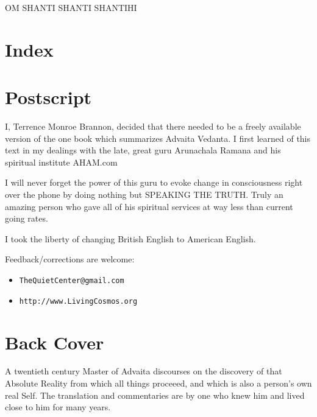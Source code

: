 \documentclass[12pt]{report}
\begin{document}
OM SHANTI SHANTI SHANTIHI



\chapter{Index}
\printindex

\chapter{Postscript}

I, Terrence Monroe Brannon, decided that there needed to be a freely
available version of the one book which summarizes Advaita Vedanta. I
first learned of this text in my dealings with the late, great
guru Arunachala
Ramana and his spiritual institute AHAM.com

I will never forget the power of this guru to evoke change in
consciousness
right over the phone by doing nothing but SPEAKING THE TRUTH. Truly an
amazing person who gave all of his spiritual services at way less than
current going rates.

I took the liberty of changing British English to American English.

Feedback/corrections are welcome: 
\begin{itemize}
\item \verb+TheQuietCenter@gmail.com+
\item \verb+http://www.LivingCosmos.org+
\end{itemize}

\chapter{Back Cover}

A twentieth century Master of Advaita discourses on the discovery of
that Absolute Reality from which all things proceeed, and which is
also a person's own real Self. The translation and commentaries are by
one who knew him and lived close to him for many years.
\end{document}

